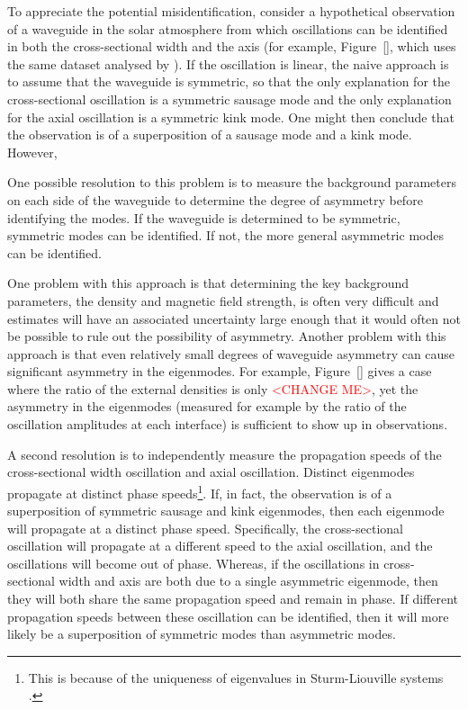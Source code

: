\documentclass[12pt]{../style-files/ociamthesis}
\begin{document}
To appreciate the potential misidentification, consider a hypothetical observation of a waveguide in the solar atmosphere from which oscillations can be identified in both the cross-sectional width and the axis (for example, Figure~\ref{}, which uses the same dataset analysed by \cite{mor_etal12}). If the oscillation is linear, the naive approach is to assume that the waveguide is symmetric, so that the only explanation for the cross-sectional oscillation is a symmetric sausage mode and the only explanation for the axial oscillation is a symmetric kink mode. One might then conclude that the observation is of a superposition of a sausage mode and a kink mode. However, 

One possible resolution to this problem is to measure the background parameters on each side of the waveguide to determine the degree of asymmetry before identifying the modes. If the waveguide is determined to be symmetric, symmetric modes can be identified. If not, the more general asymmetric modes can be identified.

One problem with this approach is that determining the key background parameters, the density and magnetic field strength, is often very difficult and estimates will have an associated uncertainty large enough that it would often not be possible to rule out the possibility of asymmetry. Another problem with this approach is that even relatively small degrees of waveguide asymmetry can cause significant asymmetry in the eigenmodes. For example, Figure~\ref{} gives a case where the ratio of the external densities is only \textcolor{red}{<CHANGE ME>}, yet the asymmetry in the eigenmodes (measured for example by the ratio of the oscillation amplitudes at each interface) is sufficient to show up in observations.

A second resolution is to independently measure the propagation speeds of the cross-sectional width oscillation and axial oscillation. Distinct eigenmodes propagate at distinct phase speeds\footnote{This is because of the uniqueness of eigenvalues in Sturm-Liouville systems \citep{boy_etal12}.}. If, in fact, the observation is of a superposition of symmetric sausage and kink eigenmodes, then each eigenmode will propagate at a distinct phase speed. Specifically, the cross-sectional oscillation will propagate at a different speed to the axial oscillation, and the oscillations will become out of phase. Whereas, if the oscillations in cross-sectional width and axis are both due to a single asymmetric eigenmode, then they will both share the same propagation speed and remain in phase. If different propagation speeds between these oscillation can be identified, then it will more likely be a superposition of symmetric modes than asymmetric modes.
\end{document}
